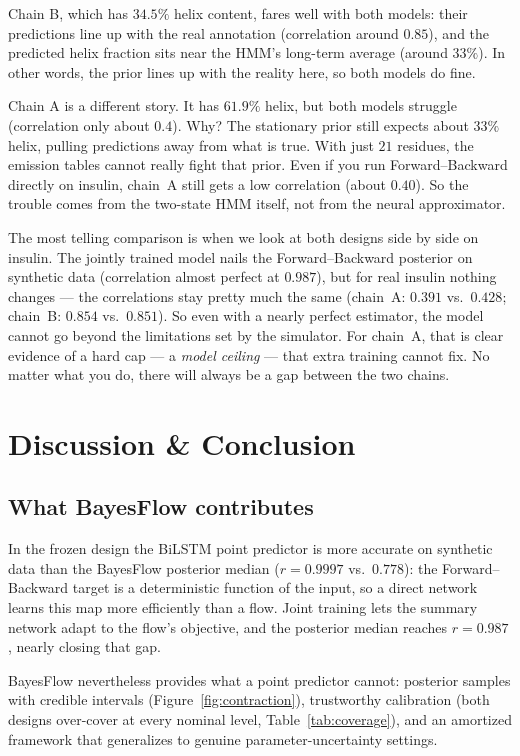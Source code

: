 \documentclass[12pt]{article}
\begin{document}
Chain B, which has $34.5\%$ helix content, fares well with both models:
their predictions line up with the real annotation (correlation around
$0.85$), and the predicted helix fraction sits near the HMM's long-term
average (around $33\%$). In other words, the prior lines up with the
reality here, so both models do fine.

Chain A is a different story. It has $61.9\%$ helix, but both models
struggle (correlation only about $0.4$). Why? The stationary prior still
expects about $33\%$ helix, pulling predictions away from what is true.
With just $21$ residues, the emission tables cannot really fight that
prior. Even if you run Forward--Backward directly on insulin, chain~A still
gets a low correlation (about $0.40$). So the trouble comes from the
two-state HMM itself, not from the neural approximator.

The most telling comparison is when we look at both designs side by side on
insulin. The jointly trained model nails the Forward--Backward posterior on
synthetic data (correlation almost perfect at $0.987$), but for real
insulin nothing changes --- the correlations stay pretty much the same
(chain~A: $0.391$ vs.\ $0.428$; chain~B: $0.854$ vs.\ $0.851$). So even
with a nearly perfect estimator, the model cannot go beyond the limitations
set by the simulator. For chain~A, that is clear evidence of a hard cap ---
a \emph{model ceiling} --- that extra training cannot fix. No matter what
you do, there will always be a gap between the two chains.


\section{Discussion \& Conclusion}

\subsection{What BayesFlow contributes}

In the frozen design the BiLSTM point predictor is more accurate on synthetic
data than the BayesFlow posterior median ($r = 0.9997$ vs.\ $0.778$): the
Forward--Backward target is a deterministic function of the input, so a
direct network learns this map more efficiently than a flow.
Joint training lets the summary network adapt to the flow's objective, and the
posterior median reaches $r = 0.987$, nearly closing that gap.

BayesFlow nevertheless provides what a point predictor cannot: posterior
samples with credible intervals (Figure~\ref{fig:contraction}), trustworthy
calibration (both designs over-cover at
every nominal level, Table~\ref{tab:coverage}), and an amortized framework that
generalizes to genuine parameter-uncertainty settings.
\end{document}
